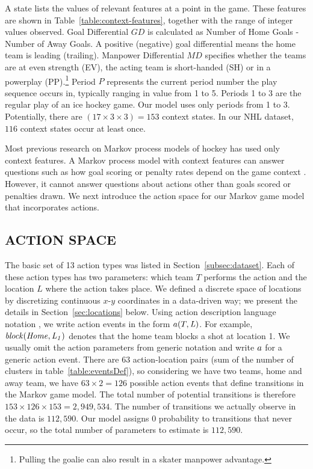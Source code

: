 A state lists the values of relevant features at a point in the game. These features are shown in Table~\ref{table:context-features}, together with the range of integer values observed.
Goal Differential $GD$ is calculated as Number of Home Goals - Number of Away Goals. A positive (negative) goal differential means the home team is leading (trailing).  Manpower Differential $MD$ specifies whether the teams are at even strength (EV), the acting team is short-handed (SH) or in a powerplay (PP).\footnote{Pulling the goalie can also result in a skater manpower advantage.} Period $P$ represents the current period number the play sequence occurs in, typically ranging in value from 1 to 5. Periods 1 to 3 are the regular play of an ice hockey game. Our model uses only periods from 1 to 3. Potentially, there are $(17 \times 3 \times 3) = 153$ context states. In our NHL dataset, $116$  context states occur at least once.



Most previous research on Markov process models of hockey has used only context features. A Markov process model with context features can answer questions such as how goal scoring or penalty rates depend on the game context \citep{Thomas2013}. However, it cannot answer questions about actions other than goals scored or penalties drawn. We next introduce the action space for our Markov game model that incorporates actions.


\subsection{ACTION SPACE}
\label{subsec:play-sequences}

The basic set of 13 action types was listed in Section~\ref{subsec:dataset}. Each of these action types has two parameters: which team $T$ performs the action and the location $L$ where the action takes place. We defined a discrete space of locations by discretizing continuous $x$-$y$ coordinates in a data-driven way; we present the details in Section~\ref{sec:locations} below. 
Using action description language notation \citep{bib:LevesquePirriReiter98}, we write action events in the form $a(T,\it{L})$. For example, $\it{block}(\it{Home},\it{L}_{1})$ denotes that the home team blocks a shot at location 1. We usually omit the action parameters from generic notation and write $a$ for a generic action event. There are 63 action-location pairs (sum of the number of clusters in table~\ref{table:eventsDef}), so considering we have two teams, home and away team, we have $63\times2 = 126$ possible action events that define transitions in the Markov game model. The total number of potential transitions is therefore $153\times126\times153 = 2,949,534$. The number of transitions we actually observe in the data is $112,590$. Our model assigns 0 probability to transitions that never occur, so the total number of parameters to estimate is $112,590$.


